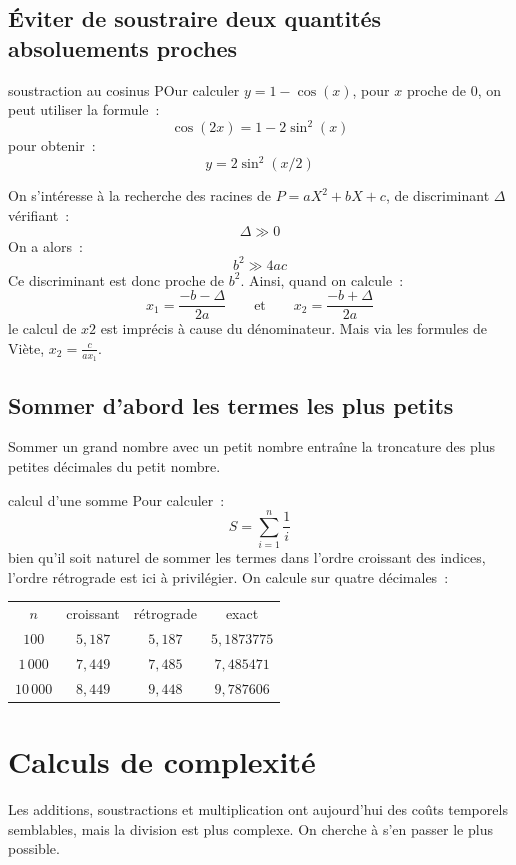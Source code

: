 \subsection{Éviter de soustraire deux quantités absoluements proches}

\begin{exemple}{}{soustraction au cosinus}
    POur calculer $y = 1-\cos(x)$, pour $x$ proche de 0, on peut utiliser la formule~:
    $$\cos(2x) = 1 - 2\sin^2(x)$$
    pour obtenir~:
    $$y = 2 \sin^2(x/2)$$
\end{exemple}

\begin{exemple}{}{}
    On s'intéresse à la recherche des racines de $P = aX^2 + bX + c$, de discriminant $\Delta$ vérifiant~:
    $$\Delta \gg 0$$
    On a alors~:
    $$b^2 \gg 4ac$$
    Ce discriminant est donc proche de $b^2$. Ainsi, quand on calcule~:
    $$x_1 = \frac{-b-\Delta}{2a} \qquad \text{et} \qquad x_2 = \frac{-b + \Delta}{2a}$$ 
    le calcul de $x2$ est imprécis à cause du dénominateur. Mais via les formules de Viète, $x_2 = \frac{c}{ax_1}$.
\end{exemple}

\subsection{Sommer d'abord les termes les plus petits}
Sommer un grand nombre avec un petit nombre entraîne la troncature des plus petites décimales du petit nombre.
\begin{exemple}{}{calcul d'une somme}
    Pour calculer~:
    $$S = \sum_{i=1}^n \frac{1}{i}$$
    bien qu'il soit naturel de sommer les termes dans l'ordre croissant des indices, l'ordre rétrograde est ici à privilégier. On calcule sur quatre décimales~:\\
    \centering
    \begin{tabular}{c|c|c|c}
        $n$ & croissant & rétrograde & exact\\
        $100$ & $5,187$ & $5,187$ & $5,1873775$\\
        $1\,000$ & $7,449$ & $7,485$ & $7,485471$\\
        $10\,000$ & $8,449$ & $9,448$ & $9,787606$\\
        
    \end{tabular}
\end{exemple}

\section{Calculs de complexité}
Les additions, soustractions et multiplication ont aujourd'hui des coûts temporels semblables, mais la division est plus complexe. On cherche à s'en passer le plus possible.

